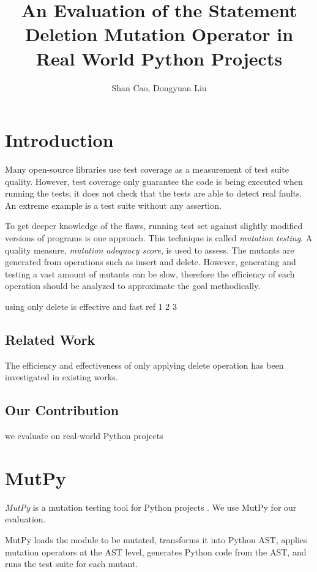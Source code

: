 \documentclass[12pt]{article}
\title{\textbf{An Evaluation of the Statement Deletion Mutation Operator in Real World Python Projects}}
\author{Shan Cao, Dongyuan Liu}
\begin{document}
\maketitle
\tableofcontents

\section{Introduction}

Many open-source libraries use test coverage as a measurement of test suite quality. However, test coverage only guarantee the code is being executed when running the tests, it does not check that the tests are able to detect real faults. An extreme example is a test suite without any assertion.

To get deeper knowledge of the flaws, running test set against slightly modified versions of programs is one approach\cite{}. This technique is called \emph{mutation testing}. A quality measure, \emph{mutation adequacy score}, is used to assess. The mutants are generated from operations such as insert and delete. However, generating and testing a vast amount of mutants can be slow, therefore the efficiency of each operation should be analyzed to approximate the goal methodically.

using only delete is effective and fast ref 1 2 3

\subsection{Related Work}

The efficiency and effectiveness of only applying delete operation has been investigated in existing works.

\subsection{Our Contribution}

we evaluate on real-world Python projects

\section{MutPy}

\emph{MutPy} is a mutation testing tool for Python projects \cite{mutpy}. We use MutPy for our evaluation.

MutPy loads the module to be mutated, transforms it into Python AST, applies mutation operators at the AST level, generates Python code from the AST, and runs the test suite for each mutant.
\end{document}
